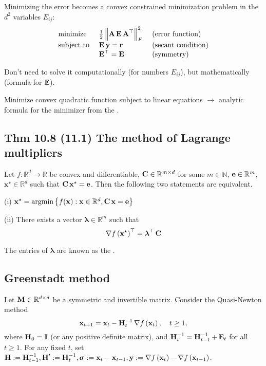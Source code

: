 Minimizing the error becomes a convex constrained minimization problem in the $d^{2}$ variables $E_{i j}$:
$$\begin{array}{lll}\text { minimize } & \frac{1}{2}\left\|\operatorname{\boldsymbol{\mathbf{A}}} \operatorname{\boldsymbol{\mathbf{E}}} \operatorname{\boldsymbol{\mathbf{A}}}^{\top}\right\|_{F}^{2} & \text { (error function) } \\ \text { subject to } & \operatorname{\boldsymbol{\mathbf{E}}} \mathbf{y}=\mathbf{r} & \text { (secant condition) } \\ & \operatorname{\boldsymbol{\mathbf{E}}}^{\top}=\operatorname{\boldsymbol{\mathbf{E}}} & \text { (symmetry) }\end{array}$$

Don't need to solve it computationally (for numbers $E_{i j}$), but mathematically (formula for $\operatorname{\mathbb{E}}$).

Minimize convex quadratic function subject to linear equations $\rightarrow$ analytic formula for the minimizer from the .





\subsection*{Thm 10.8 (11.1) The method of Lagrange multipliers}
Let $f:\mathbb{R}^{d} \rightarrow \mathbb{R}$ be convex and differentiable, $\operatorname{\boldsymbol{\mathbf{C}}} \in \mathbb{R}^{m \times d}$ for some $m \in \mathbb{N}$,  $\boldsymbol{\mathbf{e}} \in \mathbb{R}^{m}$, $\mathbf{x}^{\star} \in \mathbb{R}^{d}$ such that $\operatorname{\boldsymbol{\mathbf{C}}} \mathbf{x}^{\star}=\mathbf{e}$. Then the following two statements are equivalent.

(i) $\mathbf{x}^{\star}=\operatorname{argmin}\left\{f(\mathbf{x}): \mathbf{x} \in \mathbb{R}^{d}, \operatorname{\boldsymbol{\mathbf{C}}} \mathbf{x}=\mathbf{e}\right\}$

(ii) There exists a vector $\boldsymbol{\lambda} \in \mathbb{R}^{m}$ such that
$$
\nabla f\left(\mathbf{x}^{\star}\right)^{\top}=\boldsymbol{\lambda}^{\top} \operatorname{\boldsymbol{\mathbf{C}}} 
$$

The entries of $\boldsymbol{\lambda}$ are known as the .





\subsection*{Greenstadt method}
Let $\operatorname{\boldsymbol{\mathbf{M}}} \in \mathbb{R}^{d \times d}$ be a symmetric and invertible matrix. Consider the Quasi-Newton method
$$
\mathbf{x}_{t+1}=\mathbf{x}_{t}-\operatorname{\boldsymbol{\mathbf{H}}}_{t}^{-1} \nabla f\left(\mathbf{x}_{t}\right), \quad t \geq 1,
$$
where $\operatorname{\boldsymbol{\mathbf{H}}}_{0}=\operatorname{\boldsymbol{\mathbf{I}}}$ (or any positive definite matrix), and $\operatorname{\boldsymbol{\mathbf{H}}}_{t}^{-1}=\operatorname{\boldsymbol{\mathbf{H}}}_{t-1}^{-1}+\operatorname{\boldsymbol{\mathbf{E}}}_{t}$ for all $t \geq 1$. For any fixed $t$, set $\operatorname{\boldsymbol{\mathbf{H}}}:=\operatorname{\boldsymbol{\mathbf{H}}}_{t-1}^{-1}, \operatorname{\boldsymbol{\mathbf{H}}}^{\prime}:=\operatorname{\boldsymbol{\mathbf{H}}}_{t}^{-1}, \boldsymbol{\sigma}:=\mathbf{x}_{t}-\mathbf{x}_{t-1}, \mathbf{y}:=\nabla f\left(\mathbf{x}_{t}\right)-\nabla f\left(\mathbf{x}_{t-1}\right)$.

